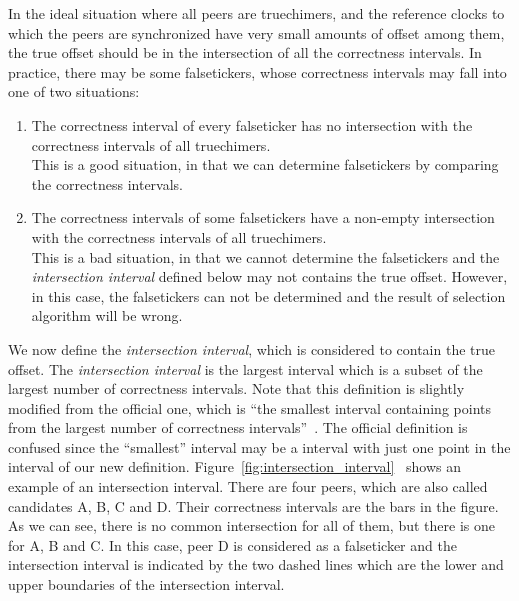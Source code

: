 In the ideal situation where all peers are truechimers, and the reference clocks
to which the peers are synchronized have very small amounts of offset among them,
the true offset should be in the intersection of all the correctness intervals. In
practice, there may be some falsetickers, whose correctness intervals may fall
into one of 
two situations:
\begin{enumerate}
    \item The correctness interval of every falseticker has no intersection
        with the correctness intervals of all truechimers.\\ 
        This is a good situation, in that we can determine falsetickers by
        comparing the correctness intervals.
    \item The correctness intervals of some falsetickers have a non-empty
        intersection with the correctness intervals of all truechimers.\\ 
        This is a bad situation, in that we cannot determine the falsetickers and
        the \emph{intersection interval} defined below may not contains the
        true offset. However, in this case, the falsetickers can not be
        determined and the result of selection algorithm will be wrong.
\end{enumerate}

We now define the \emph{intersection interval}, which is considered to contain
the true offset. The \emph{intersection interval} is the largest interval
which is a subset of the largest number of correctness intervals. Note that this
definition is slightly modified from the official one, which is ``the smallest
interval containing points from the largest number of correctness
intervals''~\cite{clock_selection}. The official definition is confused since the
``smallest'' interval may be a interval with just one point in the interval of
our new definition.
Figure~\ref{fig:intersection_interval}~\cite{clock_selection} shows an example
of an intersection interval. There are four peers, which are also called
candidates A, B, C and D\null. Their correctness intervals are the bars in the
figure. As we can see, there is no common intersection for all of them, but
there is one for A, B and C\null. In this case, peer D is considered as a
falseticker and the intersection interval is indicated by the two dashed lines
which are the lower and upper boundaries of the intersection interval.



